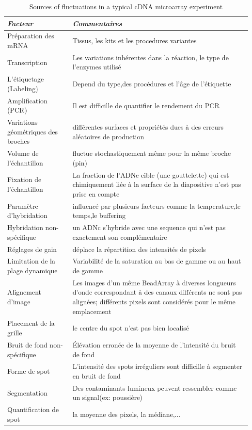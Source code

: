 \documentclass[a4paper,10pt]{article}
\begin{document}
\begin{table}[!ht]
\centering
\begin{tabular}{|p{3cm}|p{9cm}|}
\hline
 \emph{Facteur} & \emph{Commentaires}\\
\hline
Préparation des mRNA  &  Tissus, les kits et les procedures variantes \\
\hline 
Transcription & Les variations inhérentes dans la réaction, le type de l'enzymes utilisé  \\
\hline 
L'étiquetage (Labeling) & Depend du type,des procédures et l'âge de l'étiquette  \\
\hline
Amplification (PCR) & Il est difficille de quantifier le rendement du PCR\\
\hline
Variations géométriques des broches & différentes surfaces et propriétés dues à des erreurs aléatoires de production \\
\hline
Volume de l'échantillon & fluctue stochastiquement même pour la même broche (pin)  \\
\hline
Fixation de l'échantillon & La fraction de l'ADNc cible (une gouttelette) qui est chimiquement liée à la surface de la diapositive n'est pas prise en compte \\
\hline
 Paramètre d'hybridation &  influencé par plusieurs facteurs comme la temperature,le temps,le buffering \\
\hline
 Hybridation non-spécifique & un ADNc s'hybride avec une sequence qui n'est pas exactement son complémentaire \\
\hline
Réglages de gain & déplace la répartition des intensités de pixels \\
\hline
Limitation de la plage dynamique & Variabilité de la saturation au bas de gamme ou au haut de gamme \\
\hline
Alignement d'image & Les images d'un même BeadArray à diverses longueurs d'onde correspondant à des canaux différents ne sont pas alignées; différents pixels sont considérés pour le même emplacement \\
\hline
 Placement de la grille & le centre du spot n’est pas bien localisé  \\
\hline
 Bruit de fond non-spécifique& Élévation erronée de la moyenne de l'intensité du bruit de fond \\
\hline
Forme de spot & L'intensité des spots irréguliers sont difficille à segmenter en bruit de fond \\
\hline
 Segmentation & Des contaminants lumineux peuvent ressembler comme un signal(ex: poussière) \\
\hline
 Quantification de spot & la moyenne des pixels, la médiane,... \\
\hline
\end{tabular}
\caption{Sources of fluctuations in a typical cDNA microarray experiment}
\label{Sources de variation}
\end{table}
\end{document}
